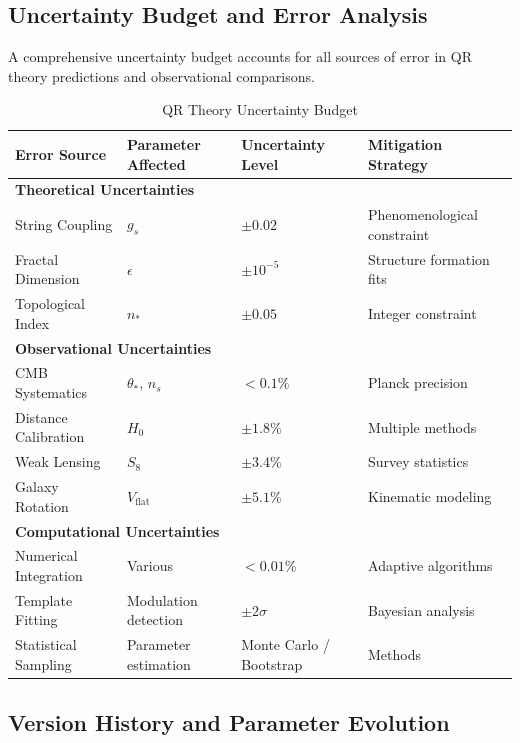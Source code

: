 \subsection{Uncertainty Budget and Error Analysis}
\label{subsec:uncertainty-budget}

A comprehensive uncertainty budget accounts for all sources of error in QR theory predictions and observational comparisons.

\begin{table}[H]
  \caption{QR Theory Uncertainty Budget}
  \label{tab:uncertainty-budget}
  \centering
  \begin{tabular}{@{}llll@{}}
    \toprule
    \textbf{Error Source} & \textbf{Parameter Affected} & \textbf{Uncertainty Level} & \textbf{Mitigation Strategy} \\
    \midrule
    \multicolumn{4}{l}{\textbf{Theoretical Uncertainties}} \\
    String Coupling   & $g_s$ & $\pm 0.02$     & Phenomenological constraint \\
    Fractal Dimension & $\epsilon$ & $\pm 10^{-5}$ & Structure formation fits \\
    Topological Index & $n_\ast$ & $\pm 0.05$   & Integer constraint \\
    \midrule
    \multicolumn{4}{l}{\textbf{Observational Uncertainties}} \\
    CMB Systematics   & $\theta_\ast$, $n_s$ & $<0.1\%$ & Planck precision \\
    Distance Calibration & $H_0$ & $\pm 1.8\%$ & Multiple methods \\
    Weak Lensing      & $S_8$ & $\pm 3.4\%$    & Survey statistics \\
    Galaxy Rotation   & $V_{\text{flat}}$ & $\pm 5.1\%$ & Kinematic modeling \\
    \midrule
    \multicolumn{4}{l}{\textbf{Computational Uncertainties}} \\
    Numerical Integration & Various & $<0.01\%$ & Adaptive algorithms \\
    Template Fitting      & Modulation detection & $\pm 2\sigma$ & Bayesian analysis \\
    Statistical Sampling  & Parameter estimation & Monte Carlo / Bootstrap & Methods \\
    \bottomrule
  \end{tabular}
\end{table}

\subsection{Version History and Parameter Evolution}
\label{subsec:version-history-parameters}

